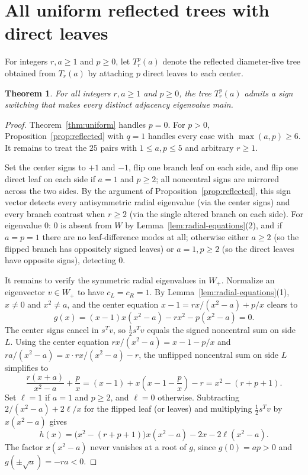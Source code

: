 \documentclass[11pt]{article}
\theoremstyle{plain}
\newtheorem{theorem}{Theorem}[section]
\theoremstyle{remark}
\begin{document}
\section{All uniform reflected trees with direct leaves}\label{sec:direct}

For integers $r,a \geq 1$ and $p \geq 0$, let $T_r^p(a)$ denote the reflected
diameter-five tree obtained from $T_r(a)$ by attaching $p$ direct leaves to
each center.

\begin{theorem}\label{thm:uniform-direct}
For all integers $r,a \geq 1$ and $p \geq 0$, the tree $T_r^p(a)$ admits a sign
switching that makes every distinct adjacency eigenvalue main.
\end{theorem}

\begin{proof}
Theorem~\ref{thm:uniform} handles $p = 0$. For $p > 0$,
Proposition~\ref{prop:reflected} with $q = 1$ handles every case with
$\max(a,p) \geq 6$. It remains to treat the $25$ pairs with
$1 \leq a,p \leq 5$ and arbitrary $r \geq 1$.

Set the center signs to $+1$ and $-1$, flip one branch leaf on each side, and
flip one direct leaf on each side if $a = 1$ and $p \geq 2$; all noncentral
signs are mirrored across the two sides. By the argument of
Proposition~\ref{prop:reflected}, this sign vector detects every antisymmetric
radial eigenvalue (via the center signs) and every branch contrast when
$r \geq 2$ (via the single altered branch on each side). For eigenvalue $0$:
$0$ is absent from $W$ by Lemma~\ref{lem:radial-equations}(2), and if $a=p=1$
there are no leaf-difference modes at all; otherwise either $a \geq 2$ (so the
flipped branch has oppositely signed leaves) or $a=1, p \geq 2$ (so the direct
leaves have opposite signs), detecting $0$.

It remains to verify the symmetric radial eigenvalues in $W_+$. Normalize an
eigenvector $v \in W_+$ to have $c_L = c_R = 1$. By
Lemma~\ref{lem:radial-equations}(1), $x \neq 0$ and $x^2 \neq a$, and the
center equation $x - 1 = rx/(x^2-a) + p/x$ clears to
\begin{equation}\label{eq:g}
  g(x) = (x - 1)x(x^2 - a) - r x^2 - p(x^2 - a) = 0.
\end{equation}
The center signs cancel in $s^T v$, so $\frac{1}{2} s^T v$ equals the signed
noncentral sum on side $L$. Using the center equation
$rx/(x^2-a) = x - 1 - p/x$ and $ra/(x^2-a) = x \cdot rx/(x^2-a) - r$, the
unflipped noncentral sum on side $L$ simplifies to
\[
  \frac{r(x+a)}{x^2-a} + \frac{p}{x}
  = (x - 1) + x\left(x - 1 - \frac{p}{x}\right) - r
  = x^2 - (r + p + 1).
\]
Set $\ell = 1$ if $a = 1$ and $p \geq 2$, and $\ell = 0$ otherwise. Subtracting
$2/(x^2-a) + 2\ell/x$ for the flipped leaf (or leaves) and multiplying
$\frac{1}{2} s^T v$ by $x(x^2-a)$ gives
\begin{equation}\label{eq:h}
  h(x) = \bigl(x^2 - (r + p + 1)\bigr)x(x^2 - a) - 2x - 2\ell(x^2 - a).
\end{equation}
The factor $x(x^2-a)$ never vanishes at a root of $g$, since $g(0) = ap > 0$
and $g(\pm\sqrt{a}) = -ra < 0$.


\end{proof}
\end{document}

